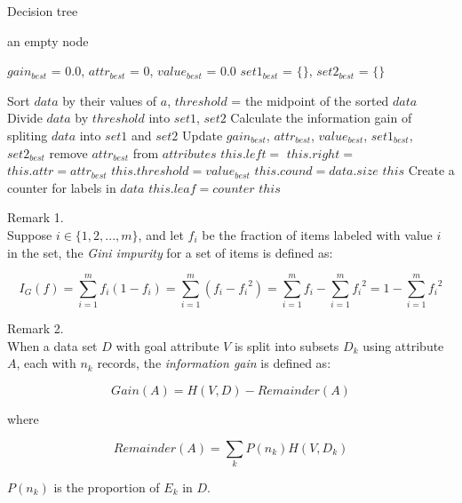 \documentclass{article}
\begin{document}
\begin{algorithm}[H]
\centering
\caption{Decision tree}
\label{alg:dt}
  \begin{algorithmic}[1]
        	\State \Return an empty node
        \EndIf

        \State $gain_{best}$ = 0.0, $attr_{best}$ = 0, $value_{best}$ = 0.0
        \State $set1_{best}$ = $\{\}$, $set2_{best}$ = $\{\}$

			    \State Sort $data$ by their values of $a$, $threshold$ = the midpoint of the sorted $data$
	    		\State Divide $data$ by $threshold$ into $set1$, $set2$
	    		\State Calculate the information gain of spliting $data$ into $set1$ and $set2$
	    			\State Update $gain_{best}$, $attr_{best}$, $value_{best}$, $set1_{best}$, $set2_{best}$
	    		\EndIf
		    \EndFor
		\EndIf
	    	\State remove $attr_{best}$ from $attributes$
	    	\State $this.left =$ 
	    	\State $this.right =$ 
			\State $this.attr = attr_{best}$
			\State $this.threshold = value_{best}$
			\State $this.cound = data.size$
			\State \Return $this$
      	\Else
      		\State Create a counter for labels in $data$
      		\State $this.leaf = counter$
      		\State \Return $this$
      	\EndIf
    \EndFunction
  \end{algorithmic}
\end{algorithm}

\begin{description}
\item Remark 1. \hfill \\
Suppose $i \in \{1, 2, ..., m\}$, and let $f_i$ be the fraction of items labeled with value $i$ in the set, the \textit{Gini impurity} for a set of items is defined as:

$$I_{G}(f) = \sum_{i=1}^{m} f_i (1-f_i) = \sum_{i=1}^{m} (f_i - {f_i}^2) = \sum_{i=1}^m f_i - \sum_{i=1}^{m} {f_i}^2 = 1 - \sum^{m}_{i=1} {f_i}^{2}$$


\item Remark 2.\hfill \\
When a data set $D$ with goal attribute $V$ is split into subsets $D_k$ using attribute $A$, each with $n_k$ records, the \textit{information gain} is defined as:

$$
Gain(A) = H(V, D) - Remainder(A)
$$

where

$$
Remainder(A) = \sum_k P(n_k) H(V, D_k)
$$

$P(n_k)$ is the proportion of $E_k$ in $D$.
\end{description}
\end{document}
